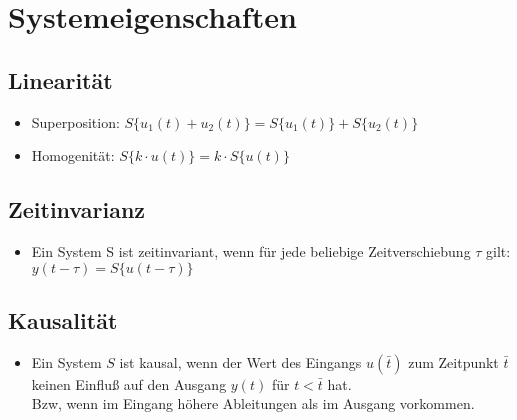 \documentclass[german]{latex4ei/latex4ei_sheet}
\begin{document}
\section{Systemeigenschaften}
\begin{sectionbox}
    \subsection{Linearität}
    \vspace{1mm}
    \begin{itemize}
        \item Superposition: $S\{u_1(t) + u_2(t)\} = S\{u_1(t)\} + S\{u_2(t)\}$
        \item Homogenität: $S\{k \cdot u(t)\} = k \cdot S\{u(t)\}$
    \end{itemize}
    \subsection{Zeitinvarianz}
    \vspace{1mm}
    \begin{itemize}
        \item Ein System S ist zeitinvariant, wenn für jede beliebige Zeitverschiebung $τ$ gilt:
        $y(t −τ) = S\{u(t −τ)\}$
    \end{itemize}
    \subsection{Kausalität}
    \vspace{1mm}
    \begin{itemize}
        \item Ein System $S$ ist kausal, wenn der Wert des Eingangs $u(\bar{t})$ zum Zeitpunkt $\bar{t}$ keinen
        Einfluß auf den Ausgang $y(t)$ für $t < \bar{t}$ hat. \\
        Bzw, wenn im Eingang höhere Ableitungen als im Ausgang vorkommen.
    \end{itemize}
    
\end{sectionbox}
\end{document}
